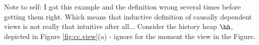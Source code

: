 \ac{Note to self: I got this example and the definition wrong several times before getting them
right. Which means that inductive definition of causally dependent views is not really that 
intuitive after all...}
Consider the history heap $\hh$, depicted in Figure \ref{fig:cc.view}(a) 
- ignore for the moment the view in the Figure.
%
%
%
%
